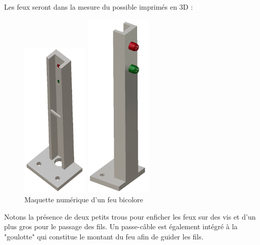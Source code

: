 		Les feux seront dans la mesure du possible imprimés en 3D :\\
		\begin{figure}[ht!]
			\centering
			\begin{minipage}{0.4\textwidth}
				\raggedleft
				\includegraphics[scale=0.9]{Graphics/feu2.png}
			\end{minipage}\hfill
			\begin{minipage}{0.4\textwidth}
				\raggedright
				\includegraphics[scale=0.8]{Graphics/feu1.png}
			\end{minipage}
			\caption{Maquette numérique d'un feu bicolore}
		\end{figure}

		\vspace{15pt}

		Notons la présence de deux petits trous pour enficher les feux sur des vis et d'un plus gros pour le passage des fils. Un passe-câble est également intégré à la "goulotte" qui constitue le montant du feu afin de guider les fils.\\

